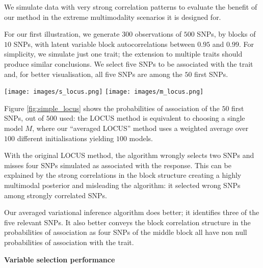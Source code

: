 \documentclass[final]{beamer}
\newenvironment{Figure}
  {\par\noindent\minipage{\linewidth}}
  {\endminipage\par}
\begin{document}
\begin{multicols*}{3}
We simulate data with very strong correlation patterns to evaluate the benefit of our method in the extreme multimodality scenarios it is designed for.

For our first illustration, we generate $300$ observations of $500$ SNPs, by blocks of $10$ SNPs, with latent variable block autocorrelations between $0.95$ and $0.99$. For simplicity, we simulate just one trait; the extension to multiple traits should produce similar conclusions. We select five SNPs to be associated with the trait and, for better visualisation, all five SNPs are among the $50$ first SNPs.
\begin{Figure}
\centering
\texttt{[image: images/s\_locus.png]}
\texttt{[image: images/m\_locus.png]}
\end{Figure}
\vspace{1em}
Figure \ref{fig:simple_locus} shows the probabilities of association of the $50$ first SNPs, out of $500$ used: the LOCUS method is equivalent to choosing a single model $M$, where our ``averaged LOCUS'' method uses a weighted average over $100$ different initialisations yielding $100$ models.

With the original LOCUS method, the algorithm wrongly selects two SNPs and misses four SNPs simulated as associated with the response. This can be explained by the strong correlations in the block structure creating a highly multimodal posterior and misleading the algorithm: it selected wrong SNPs among strongly correlated SNPs.

Our averaged variational inference algorithm does better; it identifies three of the five relevant SNPs. It also better conveys the block correlation structure in the probabilities of association as four SNPs of the middle block all have non null probabilities of association with the trait. 

\vspace{1em}

\textbf{\large Variable selection performance}


\end{multicols*}
\end{document}
